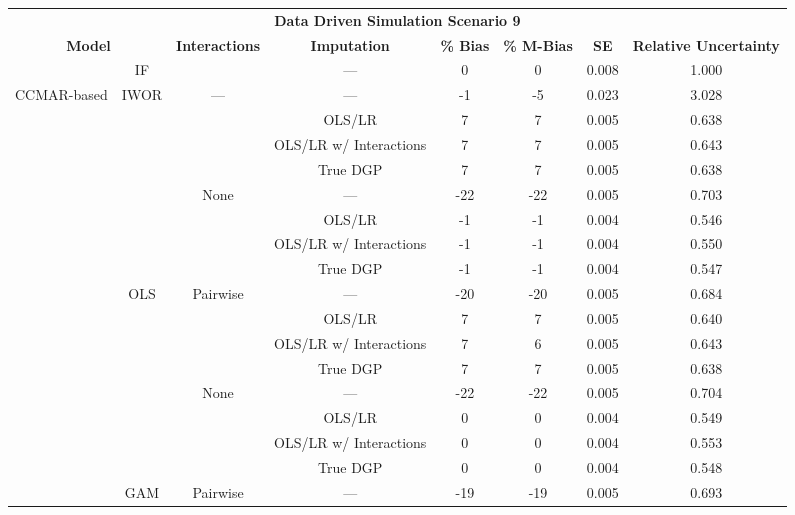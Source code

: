 \begin{table}
\centering
\begin{tabular}[ht]{|>{}c|c|c|c|c|c|c|>{}c|}
\hline
\multicolumn{8}{|c|}{\textbf{Data Driven Simulation Scenario 9}} \\
\cline{1-8}
\multicolumn{2}{|c|}{\textbf{Model}} & \textbf{Interactions} & \textbf{Imputation} & \textbf{\% Bias} & \textbf{\% M-Bias} & \textbf{SE} & \textbf{Relative Uncertainty}\\
\hline
 & IF &  & --- & 0 & 0 & 0.008 & 1.000\\
\cline{2-2}
\cline{4-8}
\multirow{-2}{*}{\centering\arraybackslash CCMAR-based} & IWOR & \multirow{-2}{*}{\centering\arraybackslash ---} & --- & -1 & -5 & 0.023 & 3.028\\
\cline{1-8}
 &  &  & OLS/LR & 7 & 7 & 0.005 & 0.638\\
\cline{4-8}
 &  &  & OLS/LR w/ Interactions & 7 & 7 & 0.005 & 0.643\\
\cline{4-8}
 &  &  & True DGP & 7 & 7 & 0.005 & 0.638\\
\cline{4-8}
 &  & \multirow{-4}{*}{\centering\arraybackslash None} & --- & -22 & -22 & 0.005 & 0.703\\
\cline{3-8}
 &  &  & OLS/LR & -1 & -1 & 0.004 & 0.546\\
\cline{4-8}
 &  &  & OLS/LR w/ Interactions & -1 & -1 & 0.004 & 0.550\\
\cline{4-8}
 &  &  & True DGP & -1 & -1 & 0.004 & 0.547\\
\cline{4-8}
 & \multirow{-8}{*}{\centering\arraybackslash OLS} & \multirow{-4}{*}{\centering\arraybackslash Pairwise} & --- & -20 & -20 & 0.005 & 0.684\\
\cline{2-8}
 &  &  & OLS/LR & 7 & 7 & 0.005 & 0.640\\
\cline{4-8}
 &  &  & OLS/LR w/ Interactions & 7 & 6 & 0.005 & 0.643\\
\cline{4-8}
 &  &  & True DGP & 7 & 7 & 0.005 & 0.638\\
\cline{4-8}
 &  & \multirow{-4}{*}{\centering\arraybackslash None} & --- & -22 & -22 & 0.005 & 0.704\\
\cline{3-8}
 &  &  & OLS/LR & 0 & 0 & 0.004 & 0.549\\
\cline{4-8}
 &  &  & OLS/LR w/ Interactions & 0 & 0 & 0.004 & 0.553\\
\cline{4-8}
 &  &  & True DGP & 0 & 0 & 0.004 & 0.548\\
\cline{4-8}
 & \multirow{-8}{*}{\centering\arraybackslash GAM} & \multirow{-4}{*}{\centering\arraybackslash Pairwise} & --- & -19 & -19 & 0.005 & 0.693\\

\end{tabular}
\end{table}

